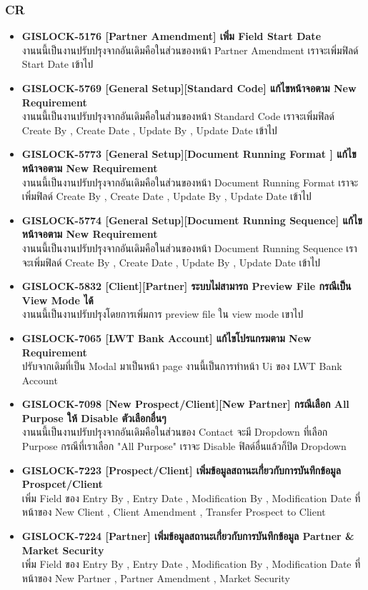\subsubsection{CR}
\begin{itemize}
    \setlength\itemsep{1em}
    \item \textbf{{GISLOCK-5176 [Partner Amendment] เพิ่ม Field Start Date}} \\
          งานนนี้เป็นงานปรับปรุงจากอันเดิมคือในส่วนของหน้า Partner Amendment เราจะเพิ่มฟิลด์ Start Date เข้าไป
    \item \textbf{{GISLOCK-5769 [General Setup][Standard Code] แก้ไขหน้าจอตาม New Requirement}} \\
          งานนนี้เป็นงานปรับปรุงจากอันเดิมคือในส่วนของหน้า Standard Code เราจะเพิ่มฟิลด์ Create By , Create Date , Update By , Update Date เข้าไป
    \item \textbf{{GISLOCK-5773 [General Setup][Document Running Format ] แก้ไขหน้าจอตาม New Requirement}} \\
          งานนนี้เป็นงานปรับปรุงจากอันเดิมคือในส่วนของหน้า Document Running Format เราจะเพิ่มฟิลด์ Create By , Create Date , Update By , Update Date เข้าไป
    \item \textbf{{GISLOCK-5774 [General Setup][Document Running Sequence] แก้ไขหน้าจอตาม New Requirement}} \\
          งานนนี้เป็นงานปรับปรุงจากอันเดิมคือในส่วนของหน้า Document Running Sequence เราจะเพิ่มฟิลด์ Create By , Create Date , Update By , Update Date เข้าไป
    \item \textbf{{GISLOCK-5832 [Client][Partner] ระบบไม่สามารถ Preview File กรณีเป็น View Mode ได้}} \\
          งานนนี้เป็นงานปรับปรุงโดยการเพิ่มการ preview file ใน view mode เขาไป
    \item \textbf{{GISLOCK-7065 [LWT Bank Account] แก้ไขโปรแกรมตาม New Requirement}} \\
          ปรับจากเดิมที่เป็น Modal มาเป็นหน้า page งานนี้เป็นการทำหน้า Ui ของ LWT Bank Account
    \item \textbf{{GISLOCK-7098 [New Prospect/Client][New Partner] กรณีเลือก All Purpose ให้ Disable ตัวเลือกอื่นๆ}} \\
          งานนนี้เป็นงานปรับปรุงจากอันเดิมคือในส่วนของ Contact จะมี Dropdown ที่เลือก Purpose กรณีที่เราเลือก "All Purpose" เราจะ Disable ฟิลด์อื่นแล้วก็ปิด Dropdown
    \item \textbf{{GISLOCK-7223 [Prospect/Client] เพิ่มข้อมูลสถานะเกี่่ยวกับการบันทึกข้อมูล Prospcet/Client}} \\
          เพิ่ม Field ของ Entry By , Entry Date , Modification By , Modification Date ที่หน้าของ New Client , Client Amendment , Transfer Prospect to Client
    \item \textbf{{GISLOCK-7224 [Partner] เพิ่มข้อมูลสถานะเกี่่ยวกับการบันทึกข้อมูล Partner \& Market Security}} \\
          เพิ่ม Field ของ Entry By , Entry Date , Modification By , Modification Date ที่หน้าของ New Partner , Partner Amendment , Market Security 
\end{itemize}

